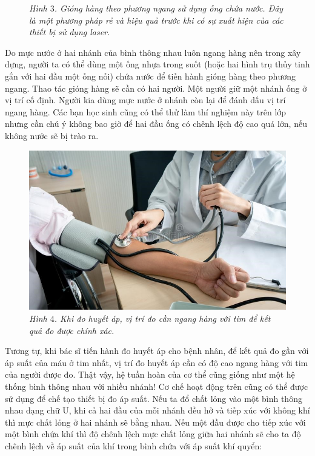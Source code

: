 \begin{multicols}{2}
\begin{figure}[H]
		\caption{\small\textit{\color{timhieukhoahoc}Hình $3$. Gióng hàng theo phương ngang sử dụng ống chứa nước. Đây là một phương pháp rẻ và hiệu quả trước khi có sự xuất hiện của các thiết bị sử dụng laser.}}
		\vspace*{-10pt}
	\end{figure}
	Do mực nước ở hai nhánh của bình thông nhau luôn ngang hàng nên trong xây dựng, người ta có thể dùng một ống nhựa trong suốt (hoặc hai hình trụ thủy tinh gắn với hai đầu một ống nối) chứa nước để tiến hành gióng hàng theo phương ngang. Thao tác gióng hàng sẽ cần có hai người. Một người giữ một nhánh ống ở vị trí cố định. Người kia dùng mực nước ở nhánh còn lại để đánh dấu vị trí ngang hàng. Các bạn học sinh cũng có thể thử làm thí nghiệm này trên lớp nhưng cần chú ý không bao giờ để hai đầu ống có chênh lệch độ cao quá lớn, nếu không nước sẽ bị trào ra. 
	\begin{figure}[H]
		\vspace*{-5pt}
		\centering
		\captionsetup{labelformat= empty, justification=centering}
		\includegraphics[width= 1\linewidth]{5}
		\caption{\small\textit{\color{timhieukhoahoc}Hình $4$. Khi đo huyết áp, vị trí đo cần ngang hàng với tim để kết quả đo được chính xác.}}
		\vspace*{-10pt}
	\end{figure}
	Tương tự, khi bác sĩ tiến hành đo huyết áp cho bệnh nhân, để kết quả đo gần với áp suất của máu ở tim nhất, vị trí đo huyết áp cần có độ cao ngang hàng với tim của người được đo. Thật vậy, hệ tuần hoàn của cơ thể cũng giống như một hệ thống bình thông nhau với nhiều nhánh!
	\vskip 0.1cm
	Cơ chế hoạt động trên cũng có thể được sử dụng để chế tạo thiết bị đo áp suất. Nếu ta đổ chất lỏng vào một bình thông nhau dạng chữ U, khi cả hai đầu của mỗi nhánh đều hở và tiếp xúc với không khí thì mực chất lỏng ở hai nhánh sẽ bằng nhau. Nếu một đầu được cho tiếp xúc với một bình chứa khí thì độ chênh lệch mực chất lỏng giữa hai nhánh sẽ cho ta độ chênh lệch về áp suất của khí trong bình chứa với áp suất khí quyển:

\end{multicols}
